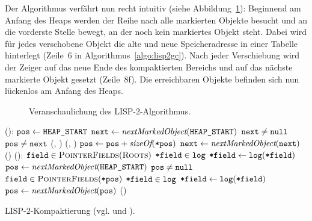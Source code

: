 Der Algorithmus verfährt nun recht intuitiv (siehe Abbildung~\ref{fig:lisp2}):
Beginnend am Anfang des Heaps werden der Reihe nach alle markierten Objekte besucht und an die vorderste Stelle bewegt, an der noch kein markiertes Objekt steht.
Dabei wird für jedes verschobene Objekt die alte und neue Speicheradresse in einer Tabelle  hinterlegt (Zeile~6 in Algorithmus~\ref{algo:lisp2gc}).
Nach jeder Verschiebung wird der Zeiger  auf das neue Ende des kompaktierten Bereichs und  auf das nächste markierte Objekt gesetzt (Zeile~8f).
Die erreichbaren Objekte befinden sich nun lückenlos am Anfang des Heaps.

\begin{figure}[H]
	\centering
	
	\caption[LISP-2-Algorithmus]{Veranschaulichung des LISP-2-Algorithmus.}
	\label{fig:lisp2}
\end{figure}

\begin{algorithm}[b!]
\begin{algorithmic}[1]
	\State \Atomic {}():
	\State \quad $\texttt{pos} \gets \texttt{HEAP\_START}$	
	\State \quad $\texttt{next} \gets \textit{nextMarkedObject}(\texttt{HEAP\_START})$ 
	\State \quad \WHILE $\texttt{next} \neq \texttt{null}$			
	\State \quad \quad \IF $\texttt{pos} \neq \texttt{next}$	
	\State \quad \quad \quad {}(, )		
	\State \quad \quad \quad {}(, )	
	\State \quad \quad $\texttt{pos} \gets \texttt{pos} + \textit{sizeOf}(\texttt{*pos})$	
	\State \quad \quad $\texttt{next} \gets \textit{nextMarkedObject}(\texttt{next})$
	\State \quad {}()
	\Statex
	\State {}():
	\State \quad \FOREACH $\texttt{field} \in \textsc{PointerFields}(\textsc{Roots})$
	\State \quad \quad \IF $\texttt{*field} \in \texttt{log}$ 
	\State \quad \quad \quad $\texttt{*field} \gets \texttt{log}(\texttt{*field})$
	\State \quad $\texttt{pos} \gets \textit{nextMarkedObject}(\texttt{HEAP\_START})$		
	\State \quad \WHILE $\texttt{pos} \neq \texttt{null}$
	\State \quad \quad \FOREACH $\texttt{field} \in \textsc{PointerFields}(\texttt{*pos})$
	\State \quad \quad \quad \IF $\texttt{*field} \in \texttt{log}$
	\State \quad \quad \quad \quad $\texttt{*field} \gets \texttt{log}(\texttt{*field})$
	\State \quad \quad $\texttt{pos} \gets \textit{nextMarkedObject}(\texttt{pos})$
	\State \quad {}()		
\end{algorithmic}
\caption[LISP-2-Kompaktierung]{LISP-2-Kompaktierung (vgl. \cite[S. 35]{handbook} und \cite[S. 7ff]{lisp2gc}).}
\label{algo:lisp2gc}
\end{algorithm}


